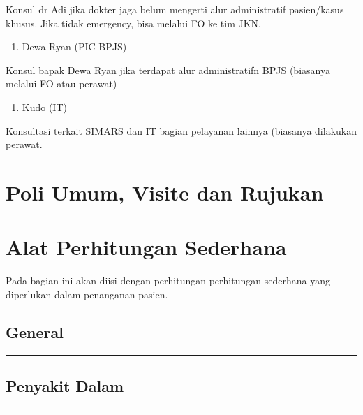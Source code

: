 \documentclass[
]{book}
\providecommand{\tightlist}{%
  \setlength{\itemsep}{0pt}\setlength{\parskip}{0pt}}
\begin{document}
Konsul dr Adi jika dokter jaga belum mengerti alur administratif pasien/kasus khusus. Jika tidak emergency, bisa melalui FO ke tim JKN.

\begin{enumerate}
\def\labelenumi{\arabic{enumi}.}
\setcounter{enumi}{1}
\tightlist
\item
  Dewa Ryan (PIC BPJS)
\end{enumerate}

Konsul bapak Dewa Ryan jika terdapat alur administratifn BPJS (biasanya melalui FO atau perawat)

\begin{enumerate}
\def\labelenumi{\arabic{enumi}.}
\setcounter{enumi}{2}
\tightlist
\item
  Kudo (IT)
\end{enumerate}

Konsultasi terkait SIMARS dan IT bagian pelayanan lainnya (biasanya dilakukan perawat.

\hypertarget{poli-umum-visite-dan-rujukan}{%
\chapter{Poli Umum, Visite dan Rujukan}\label{poli-umum-visite-dan-rujukan}}

\hypertarget{alat-perhitungan-sederhana}{%
\chapter{Alat Perhitungan Sederhana}\label{alat-perhitungan-sederhana}}

Pada bagian ini akan diisi dengan perhitungan-perhitungan sederhana yang diperlukan dalam penanganan pasien.

\hypertarget{general}{%
\section{General}\label{general}}

\begin{center}\rule{0.5\linewidth}{0.5pt}\end{center}

\hypertarget{penyakit-dalam}{%
\section{Penyakit Dalam}\label{penyakit-dalam}}

\begin{center}\rule{0.5\linewidth}{0.5pt}\end{center}
\end{document}

